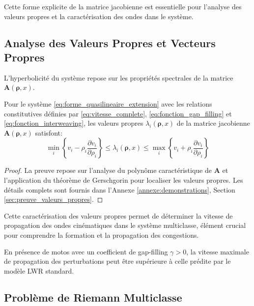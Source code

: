 Cette forme explicite de la matrice jacobienne est essentielle pour l'analyse des valeurs propres et la caractérisation des ondes dans le système.

\subsection{Analyse des Valeurs Propres et Vecteurs Propres}\label{subsec:valeurs_propres_base}

L'hyperbolicité du système repose sur les propriétés spectrales de la matrice $\mathbf{A}(\boldsymbol{\rho}, x)$.

\begin{theorem}
Pour le système \eqref{eq:forme_quasilineaire_extension} avec les relations constitutives définies par \eqref{eq:vitesse_complete}, \eqref{eq:fonction_gap_filling} et \eqref{eq:fonction_interweaving}, les valeurs propres $\lambda_i(\boldsymbol{\rho}, x)$ de la matrice jacobienne $\mathbf{A}(\boldsymbol{\rho}, x)$ satisfont:
\begin{equation}
\min_{i} \left\{v_i - \rho_i \frac{\partial v_i}{\partial \rho_i}\right\} \leq \lambda_i(\boldsymbol{\rho}, x) \leq \max_{i} \left\{v_i + \rho_i \frac{\partial v_i}{\partial \rho_i}\right\}
\end{equation}
\end{theorem}

\begin{proof}
La preuve repose sur l'analyse du polynôme caractéristique de $\mathbf{A}$ et l'application du théorème de Gerschgorin pour localiser les valeurs propres. Les détails complets sont fournis dans l'Annexe \ref{annexe:demonstrations}, Section \ref{sec:preuve_valeurs_propres}.
\end{proof}

Cette caractérisation des valeurs propres permet de déterminer la vitesse de propagation des ondes cinématiques dans le système multiclasse, élément crucial pour comprendre la formation et la propagation des congestions.

\begin{corollary}
En présence de motos avec un coefficient de gap-filling $\gamma > 0$, la vitesse maximale de propagation des perturbations peut être supérieure à celle prédite par le modèle LWR standard.
\end{corollary}

\subsection{Problème de Riemann Multiclasse}
\label{subsec:riemann_multiclasse}


